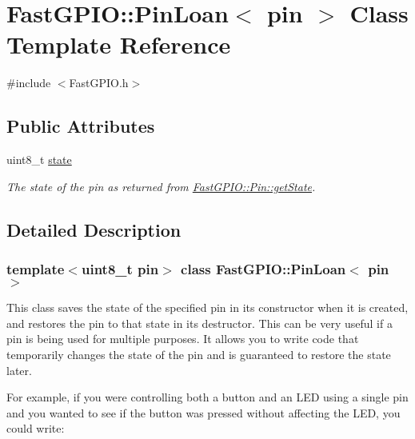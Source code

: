 \hypertarget{class_fast_g_p_i_o_1_1_pin_loan}{}\section{Fast\+G\+P\+IO\+:\+:Pin\+Loan$<$ pin $>$ Class Template Reference}
\label{class_fast_g_p_i_o_1_1_pin_loan}


{\ttfamily \#include $<$Fast\+G\+P\+I\+O.\+h$>$}

\subsection*{Public Attributes}
\begin{DoxyCompactItemize}
\item 
\mbox{\label{class_fast_g_p_i_o_1_1_pin_loan_a86acee97ba5ecd85d839dc31653e2727}} 
uint8\+\_\+t \hyperlink{class_fast_g_p_i_o_1_1_pin_loan_a86acee97ba5ecd85d839dc31653e2727}{state}
\begin{DoxyCompactList}\small\item\em The state of the pin as returned from \hyperlink{class_fast_g_p_i_o_1_1_pin_a79035949bafe62634210dd41486dba2c}{Fast\+G\+P\+I\+O\+::\+Pin\+::get\+State}. \end{DoxyCompactList}\end{DoxyCompactItemize}


\subsection{Detailed Description}
\subsubsection*{template$<$uint8\+\_\+t pin$>$\newline
class Fast\+G\+P\+I\+O\+::\+Pin\+Loan$<$ pin $>$}

This class saves the state of the specified pin in its constructor when it is created, and restores the pin to that state in its destructor. This can be very useful if a pin is being used for multiple purposes. It allows you to write code that temporarily changes the state of the pin and is guaranteed to restore the state later.

For example, if you were controlling both a button and an L\+ED using a single pin and you wanted to see if the button was pressed without affecting the L\+ED, you could write\+:


